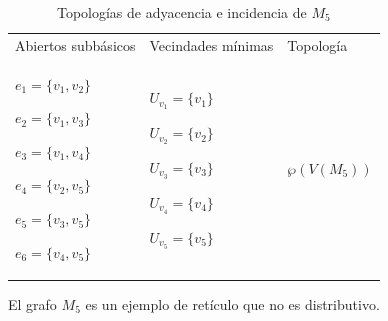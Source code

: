 \begin{table}[p]
\begin{tabular}{@{}>{\centering\arraybackslash}m{}>{\centering\arraybackslash}m{}>{\centering\arraybackslash}m{}@{}}
      \hline
      \multicolumn{3}{c}{\textbf{Topología de incidencia}} \\
      \hline
      Abiertos subbásicos & Vecindades mínimas & Topología \\
      \hline
         ${e_{1}=\{v_1,v_2\}}$\par
         ${e_{2}=\{v_1,v_3\}}$\par
         ${e_{3}=\{v_1,v_4\}}$\par
         ${e_{4}=\{v_2,v_5\}}$\par
         ${e_{5}=\{v_3,v_5\}}$\par
         ${e_{6}=\{v_4,v_5\}}$
      &
         ${U_{v_1}=\{v_1\}}$\par
         ${U_{v_2}=\{v_2\}}$\par
         ${U_{v_3}=\{v_3\}}$\par
         ${U_{v_4}=\{v_4\}}$\par
         ${U_{v_5}=\{v_5\}}$
      &
         $\wp\left(V\left(M_5\right)\right)$ \\[6pt]
      \hline
   \end{tabular}
   \caption{Topologías de adyacencia e incidencia de $M_5$}
   \label{tab:topologias_M_5}

   \vspace{2em}
   \begin{minipage}{\textwidth}
      \normalsize
      El grafo $M_5$ es un ejemplo de retículo que no es distributivo.
   \end{minipage}
\end{table}
